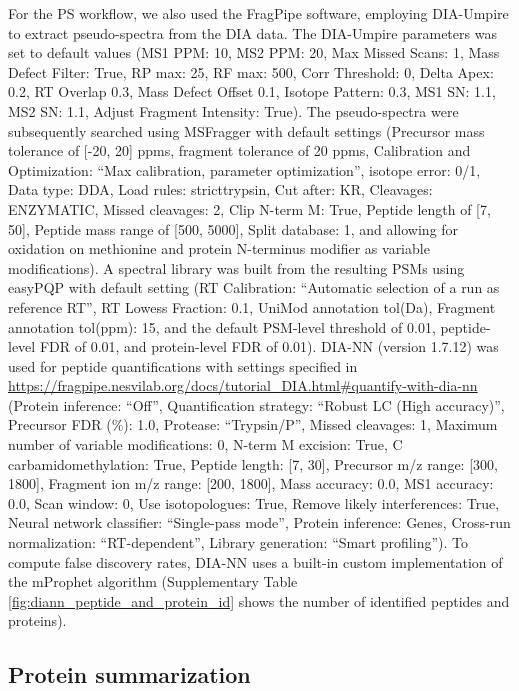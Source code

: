 \documentclass[10pt,letterpaper]{article}
\begin{document}
For the PS workflow, we also used the FragPipe software, employing DIA-Umpire to extract pseudo-spectra from the DIA data. The DIA-Umpire parameters was set to default values (MS1 PPM: 10, MS2 PPM: 20, Max Missed Scans: 1, Mass Defect Filter: True, RP max: 25, RF max: 500, Corr Threshold: 0, Delta Apex: 0.2, RT Overlap 0.3, Mass Defect Offset 0.1, Isotope Pattern: 0.3, MS1 SN: 1.1, MS2 SN: 1.1, Adjust Fragment Intensity: True). The pseudo-spectra were subsequently searched using MSFragger with default settings (Precursor mass tolerance of [-20, 20] ppms, fragment tolerance of 20 ppms, Calibration and Optimization: ``Max calibration, parameter optimization'', isotope error: 0/1, Data type: DDA, Load rules: stricttrypsin, Cut after: KR, Cleavages: ENZYMATIC, Missed cleavages: 2, Clip N-term M: True, Peptide length of [7, 50], Peptide mass range of [500, 5000], Split database: 1, and allowing for oxidation on methionine and protein N-terminus modifier as variable modifications). A spectral library was built from the resulting PSMs using easyPQP with default setting (RT Calibration: ``Automatic selection of a run as reference RT'', RT Lowess Fraction: 0.1, UniMod annotation tol(Da), Fragment annotation tol(ppm): 15, and the default PSM-level threshold of 0.01, peptide-level FDR of 0.01, and protein-level FDR of 0.01). DIA-NN (version 1.7.12) was used for peptide quantifications with settings specified in \url{https://fragpipe.nesvilab.org/docs/tutorial_DIA.html#quantify-with-dia-nn} (Protein inference: ``Off'', Quantification strategy: ``Robust LC (High accuracy)'', Precursor FDR (\%): 1.0, Protease: ``Trypsin/P'', Missed cleavages: 1, Maximum number of variable modifications: 0, N-term M excision: True, C carbamidomethylation: True, Peptide length: [7, 30], Precursor m/z range: [300, 1800], Fragment ion m/z range: [200, 1800], Mass accuracy: 0.0, MS1 accuracy: 0.0, Scan window: 0, Use isotopologues: True, Remove likely interferences: True, Neural network classifier: ``Single-pass mode'', Protein inference: Genes, Cross-run normalization: ``RT-dependent'', Library generation: ``Smart profiling''). To compute false discovery rates, DIA-NN uses a built-in custom implementation of the mProphet algorithm\cite{reiter2011mprophet, demichev2020dia} (Supplementary Table \ref{fig:diann_peptide_and_protein_id} shows the number of identified peptides and proteins). 


\subsection*{Protein summarization}
\end{document}
